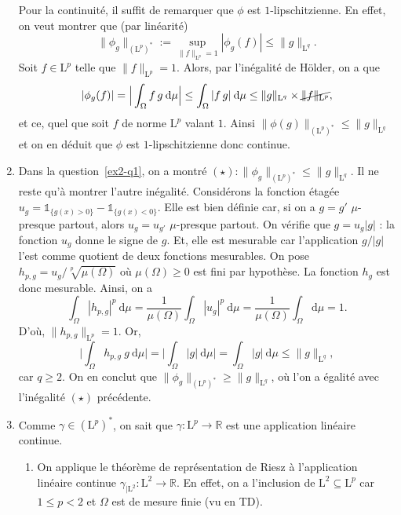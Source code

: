 \documentclass{../../td}
\begin{document}
\begin{enumerate}
      Pour la continuité, il suffit de remarquer que $\phi$ est $1$-lipschitzienne.
      En effet, on veut montrer que (par linéarité) \[
      \| \phi_g \|_{(\mathrm{L}^p)^*} := \sup_{\|f\|_{\mathrm{L}^p} = 1} | \phi_g(f)| \le \|g\|_{\mathrm{L}^q}
      .\]
      Soit $f \in \mathrm{L}^p$ telle que $\|f\|_{\mathrm{L}^p} = 1$.
      Alors, par l'inégalité de Hölder, on a que \[
        |\phi_g(f)| = \Big|\int_\Omega f\,g\:\mathrm{d}\mu\Big| \le \int_\Omega |f\,g|\:\mathrm{d}\mu \le \|g\|_{\mathrm{L}^q} \times \cancel{\|f\|_{\mathrm{L}^p}}
      ,\]et ce, quel que soit $f$ de norme $\mathrm{L}^p$ valant $1$.
      Ainsi $\|\phi(g)\|_{(\mathrm{L}^p)^*} \le \|g\|_{\mathrm{L}^q}$ et on en déduit que $\phi$ est  $1$-lipschitzienne donc continue.
    \item \label{ex2-q2} Dans la question~\ref{ex2-q1}, on a montré $(\star) : \|\phi_g\|_{(\mathrm{L}^p)^*} \le \|g\|_{\mathrm{L}^q}$.
      Il ne reste qu'à montrer l'autre inégalité.
      Considérons la fonction étagée $u_g = \mathds{1}_{\{g(x) > 0\}} - \mathds{1}_{\{g(x) < 0\}}$.
      Elle est bien définie car, si on a $g = g'$ $\mu$-presque partout, alors $u_g = u_{g'}$ $\mu$-presque partout.
      On vérifie que $g = u_g |g|$ : la fonction $u_g$ donne le signe de $g$.
      Et, elle est mesurable car l'application $g / |g|$ l'est comme quotient de deux fonctions mesurables.
      On pose $h_{p,g} = u_g / \sqrt[p]{\mu(\Omega)}$ où $\mu(\Omega) \ge 0$ est fini par hypothèse.
      La fonction $h_g$ est donc mesurable.
      Ainsi, on a \[
      \int_\Omega |h_{p,g}|^p\:\mathrm{d}\mu = \frac{1}{\mu(\Omega)} \int_\Omega |u_g|^p\:\mathrm{d}\mu = \frac{1}{\mu(\Omega)}\int_\Omega \mathrm{d}\mu = 1
      .\] 
      D'où, $\|h_{p,g}\|_{\mathrm{L}^p} = 1$.
      Or, \[
        \Big|\int_{\Omega} h_{p,g}\:g\:\mathrm{d}\mu\Big| = \Big|\int_\Omega |g|\: \mathrm{d}\mu\Big| = \int_\Omega |g|\:\mathrm{d}\mu \le \|g\|_{\mathrm{L}^q}
      ,\] car $q \ge 2$.
      On en conclut que $\|\phi_g\|_{(\mathrm{L}^p)^*} \ge \|g\|_{\mathrm{L}^q}$, où l'on a égalité avec l'inégalité $(\star)$ précédente.
    \item Comme $\gamma \in (\mathrm{L}^p)^*$, on sait que $\gamma : \mathrm{L}^p \to \mathds{R}$ est une application linéaire continue.
      \begin{enumerate}
        \item On applique le théorème de représentation de Riesz à l'application linéaire continue $\gamma_{|\mathrm{L}^2} : \mathrm{L}^2 \to \mathds{R}$.
          En effet, on a l'inclusion de $\mathrm{L}^2 \subseteq \mathrm{L}^p$ car $1 \le p < 2$ et $\Omega$ est de mesure finie (vu en TD).

\end{enumerate}
\end{enumerate}
\end{document}
